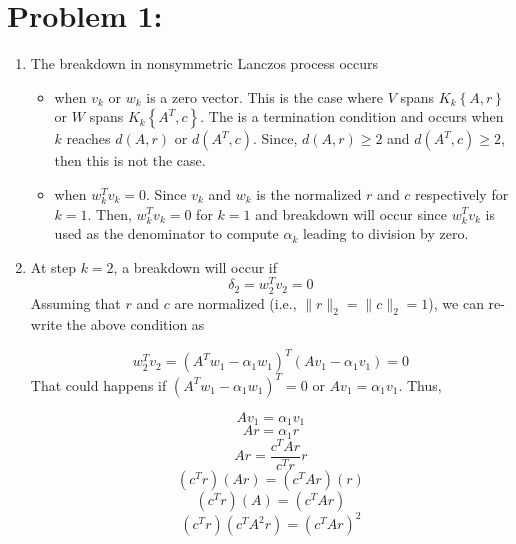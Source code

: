 \section*{Problem 1:}
\begin{enumerate}
\item The breakdown in nonsymmetric Lanczos process occurs
\begin{itemize}
\item when $v_{k}$ or $w_{k}$ is a zero vector. This is the case where $V$ spans $K_{k}
\left\lbrace A,r \right\rbrace$ or $W$ spans $K_{k}\left\lbrace A^{T},c \right\rbrace$. The is a termination condition and occurs when $k$ reaches $d(A,r)$ or $d(A^{T},c)$. Since, $d(A,r) \geq 2$ and $d(A^{T},c) \geq 2$, then this is not the case. 

\item when $w_{k}^{T}v_{k} =0$. Since $v_{k}$ and $w_{k}$ is the normalized $r$ and $c$ respectively for $k=1$. Then, $w_{k}^{T}v_{k} = 0$ for $k=1$ and breakdown will occur since $w_{k}^{T}v_{k}$ is used as the denominator to compute $\alpha_{k}$ leading to division by zero. 
\end{itemize}

\item At step $k = 2$, a breakdown will occur if 
$$
\delta_{2} = w_{2}^{T}v_{2} = 0
$$
Assuming that $r$ and $c$ are normalized (i.e., $\parallel r\parallel_{2} = \parallel c\parallel_{2} =1$), we can re-write the above condition as 

$$
w_{2}^{T}v_{2} = (A^{T}w_{1} - \alpha_{1}w_{1})^{T} (Av_{1} - \alpha_{1}v_{1}) = 0
$$
That could happens if  $(A^{T}w_{1} - \alpha_{1}w_{1})^{T}=0$ or $Av_{1} = \alpha_{1}v_{1}$. Thus, 

$$
Av_{1} = \alpha_{1}v_{1}
$$
$$
Ar = \alpha_{1}r
$$
$$
Ar = \frac{c^{T}Ar}{c^{T}r}r
$$
$$
(c^{T}r)(Ar) = (c^{T}Ar)(r)
$$
$$
(c^{T}r)(A) = (c^{T}Ar)
$$
$$
(c^{T}r)(c^{T}A^{2}r) = (c^{T}Ar)^{2}
$$

\end{enumerate}
